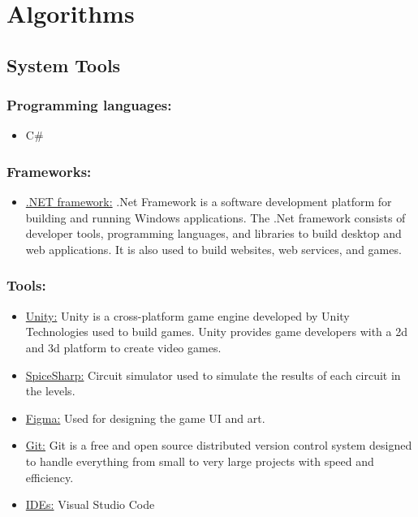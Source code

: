 \documentclass[../main.tex]{subfiles}
\begin{document}
\section{Algorithms}
\subsection{System Tools}
\subsubsection{Programming languages: }
\begin{itemize}
    \item C\#
\end{itemize}

\subsubsection{Frameworks:}
\begin{itemize}
    \item \underline{.NET framework:} .Net Framework is a software development platform for building and running Windows applications. The .Net framework consists of developer tools, programming languages, and libraries to build desktop and web applications. It is also used to build websites, web services, and games. 
\end{itemize}

\subsubsection{Tools:} 
\begin{itemize}
    \item \underline{Unity:} Unity is a cross-platform game engine developed by Unity Technologies used to build games. Unity provides game developers with a \acrshort{2d} and  \acrshort{3d} platform to create video games.
    \item \underline{SpiceSharp:} Circuit simulator used to simulate the results of each circuit in the levels. 
     \item \underline{Figma:} Used for designing the game UI and art.
      \item \underline{Git:} Git is a free and open source distributed version control system designed to handle everything from small to very large projects with speed and efficiency.
      \item \underline{IDEs:} Visual Studio Code 
\end{itemize}
\end{document}
